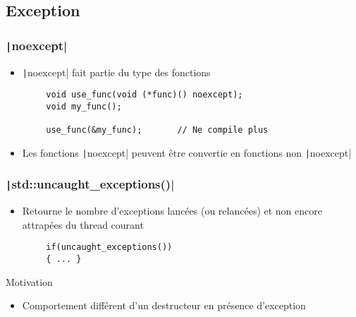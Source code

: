 \documentclass[C++.tex]{subfiles}
\begin{document}
\subsection*{Exception}
\begin{frame}[fragile]
	\frametitle{\texttt|noexcept|}
	\begin{itemize}
		\item \texttt|noexcept| fait partie du type des fonctions
	\end{itemize}

	\begin{verbatim}
		void use_func(void (*func)() noexcept);
		void my_func();

		use_func(&my_func);       // Ne compile plus
	\end{verbatim}


	\begin{itemize}
		\item Les fonctions \texttt|noexcept| peuvent être convertie en fonctions non \texttt|noexcept|
	\end{itemize}

\end{frame}

\begin{frame}[fragile]
	\frametitle{\texttt|std::uncaught_exceptions()|}
	\begin{itemize}
		\item Retourne le nombre d'exceptions lancées (ou relancées) et non encore attrapées du thread courant
	\end{itemize}

	\begin{verbatim}
		if(uncaught_exceptions())
		{ ... }
	\end{verbatim}

	\begin{block}{Motivation}
		\begin{itemize}
			\item Comportement différent d'un destructeur en présence d'exception

		\end{itemize}
	\end{block}

\end{frame}
\end{document}
